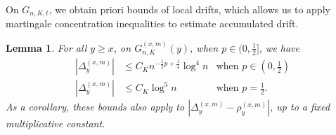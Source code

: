 \documentclass[twoside,12pt, a4paper]{article}
\newtheorem{lemma}{Lemma}[section]
\numberwithin{equation}{section}
\theoremstyle{remark}
\begin{document}
On $G_{n, K, t}$, we obtain priori bounds of local drifts, which allows us to apply martingale concentration inequalities to estimate accumulated drift.
\begin{lemma}\label{lm:lipchitz-bound-on-good-event}
	For all  $y \ge x$, on $G_{n, K}^{(x,m)}(y)$, when $p \in (0,\frac{1}{2}]$,  we have
	\begin{align*}
		\left| \Delta_y^{(x,m)} \right| &\le C_K n^{-\frac{1}{2}p + \frac{1}{4}} \log^4 n &\text{when }p \in \left(0,\frac{1}{2}\right)\\
		\left| \Delta_y^{(x,m)} \right| &\le C_K \log^5 n &\text{when }p = \frac{1}{2}
		.\end{align*}
	As a corollary, these bounds also apply to $\left| \Delta_y^{(x,m)} - \rho_y^{(x,m)} \right| $, up to a fixed multiplicative constant.
\end{lemma}
\end{document}
